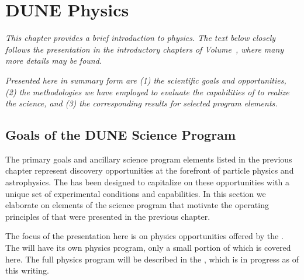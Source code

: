 \chapter{DUNE Physics}
\label{ch:exec-phys}


\textit{This chapter provides a brief introduction to  physics.  The text below closely follows the presentation in the introductory chapters of Volume~\volnumberphysics{}, 
where many more details may be found.}


\textit{Presented here in summary form are   
(1) the scientific goals and opportunities, 
(2) the methodologies we have 
employed to evaluate the capabilities of  to realize 
the science, and
(3) the corresponding results for selected program elements.}  


\section{Goals of the DUNE Science Program}
\label{sec:exec-phys-key-goals}

The primary goals and ancillary science program elements listed in the previous 
chapter represent discovery opportunities at the forefront of particle physics and 
astrophysics.  The  has been designed to capitalize on these opportunities with 
a unique set of experimental conditions and capabilities.  In this section we 
elaborate on elements of the science program that motivate the operating principles   
%
of  
that were presented in the previous chapter. 


The focus of the presentation here is on physics opportunities offered 
by the  .
The   will have its own physics program, only a small portion 
of which is covered here.  
The full  physics program will be described in the  , 
which is in progress as of this writing.


